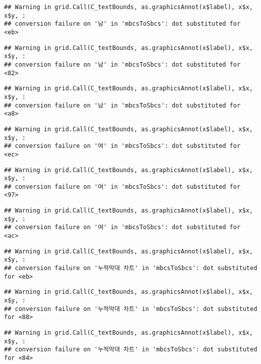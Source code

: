 \documentclass[
]{article}
\begin{document}
\begin{verbatim}
## Warning in grid.Call(C_textBounds, as.graphicsAnnot(x$label), x$x, x$y, :
## conversion failure on '남' in 'mbcsToSbcs': dot substituted for <eb>
\end{verbatim}

\begin{verbatim}
## Warning in grid.Call(C_textBounds, as.graphicsAnnot(x$label), x$x, x$y, :
## conversion failure on '남' in 'mbcsToSbcs': dot substituted for <82>
\end{verbatim}

\begin{verbatim}
## Warning in grid.Call(C_textBounds, as.graphicsAnnot(x$label), x$x, x$y, :
## conversion failure on '남' in 'mbcsToSbcs': dot substituted for <a8>
\end{verbatim}

\begin{verbatim}
## Warning in grid.Call(C_textBounds, as.graphicsAnnot(x$label), x$x, x$y, :
## conversion failure on '여' in 'mbcsToSbcs': dot substituted for <ec>
\end{verbatim}

\begin{verbatim}
## Warning in grid.Call(C_textBounds, as.graphicsAnnot(x$label), x$x, x$y, :
## conversion failure on '여' in 'mbcsToSbcs': dot substituted for <97>
\end{verbatim}

\begin{verbatim}
## Warning in grid.Call(C_textBounds, as.graphicsAnnot(x$label), x$x, x$y, :
## conversion failure on '여' in 'mbcsToSbcs': dot substituted for <ac>
\end{verbatim}

\begin{verbatim}
## Warning in grid.Call(C_textBounds, as.graphicsAnnot(x$label), x$x, x$y, :
## conversion failure on '누적막대 차트' in 'mbcsToSbcs': dot substituted for <eb>
\end{verbatim}

\begin{verbatim}
## Warning in grid.Call(C_textBounds, as.graphicsAnnot(x$label), x$x, x$y, :
## conversion failure on '누적막대 차트' in 'mbcsToSbcs': dot substituted for <88>
\end{verbatim}

\begin{verbatim}
## Warning in grid.Call(C_textBounds, as.graphicsAnnot(x$label), x$x, x$y, :
## conversion failure on '누적막대 차트' in 'mbcsToSbcs': dot substituted for <84>
\end{verbatim}
\end{document}
